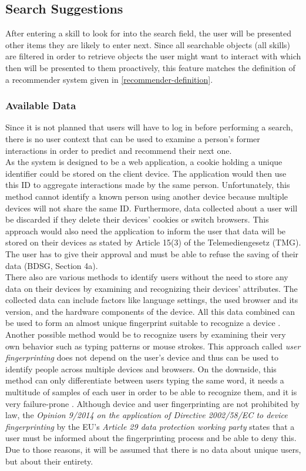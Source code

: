 \newpage

\subsection{Search Suggestions}
\label{autocomplete}
After entering a skill to look for into the search field, the user will be presented other items they are likely to enter next. Since all searchable objects (all skills) are filtered in order to retrieve objects the user might want to interact with which then will be presented to them proactively, this feature matches the definition of a recommender system given in \ref{recommender-definition}.

\subsubsection{Available Data}
Since it is not planned that users will have to log in before performing a search,
there is no user context that can be used to examine a person's former interactions
in order to predict and recommend their next one.\\
As the system is designed to be a web application, a cookie holding a unique identifier could be stored on the client device. The application would then use this ID to aggregate interactions made by the same person. Unfortunately, this method cannot identify a known person using another device because multiple devices will not share the same ID. Furthermore, data collected about a user will be discarded if they delete their devices' cookies or switch browsers.
This approach would also need the application to inform the user that data will be stored on their devices as stated by Article 15(3) of the Telemediengesetz (TMG). The user has to give their approval and must be able to refuse the saving of their data (BDSG, Section 4a).\\
There also are various methods to identify users without the need to store any data on their devices by examining and recognizing their devices' attributes. The collected data can include
factors like language settings, the used browser and its version, and the hardware components of the device. All this data combined can be used to form an almost unique fingerprint suitable to recognize a device \cite{finger}.\\
Another possible method would be to recognize users by examining their very own behavior such as typing patterns or mouse strokes. This approach called \textit{user fingerprinting} does not depend on the user's device and thus can be used to identify people across multiple devices and browsers. On the downside, this method can only differentiate between users typing the same word, it needs a multitude of samples of each user in order to be able to recognize them, and it is very failure-prone \cite{typing}.
Although device and user fingerprinting are not prohibited by law,
the \textit{Opinion 9/2014 on the application of Directive 2002/58/EC to device
fingerprinting} by the EU's \textit{Article 29 data protection working party} states that a user must be informed about the fingerprinting process and be able to deny this.
Due to those reasons, it will be assumed that there is no data about unique users, but about their entirety.

